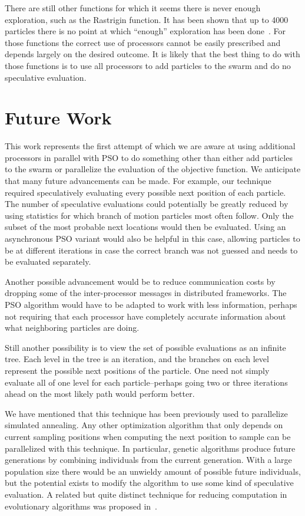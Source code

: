 \documentclass[conference,letterpaper]{IEEEtran}
\begin{document}
There are still other functions for which it seems there is never enough
exploration, such as the Rastrigin function.  It has been shown that up to 4000
particles there is no point at which ``enough'' exploration has been
done~\cite{mcnabb-cec09}.  For those functions the correct use of processors
cannot be easily prescribed and depends largely on the desired outcome.  It is
likely that the best thing to do with those functions is to use all processors
to add particles to the swarm and do no speculative evaluation.

\section{Future Work}
\label{sec:future}

This work represents the first attempt of which we are aware at using
additional processors in parallel with PSO to do something other than either
add particles to the swarm or parallelize the evaluation of the objective
function.  We anticipate that many future advancements can be made.  For
example, our technique required speculatively evaluating every possible next
position of each particle.  The number of speculative evaluations could
potentially be greatly reduced by using statistics for which branch of motion
particles most often follow.  Only the subset of the most probable next
locations would then be evaluated.  Using an asynchronous PSO variant would
also be helpful in this case, allowing particles to be at different iterations
in case the correct branch was not guessed and needs to be evaluated
separately.

Another possible advancement would be to reduce communication costs by dropping
some of the inter-processor messages in distributed frameworks.  The PSO
algorithm would have to be adapted to work with less information, perhaps not
requiring that each processor have completely accurate information about what
neighboring particles are doing.

Still another possibility is to view the set of possible evaluations as an
infinite tree.  Each level in the tree is an iteration, and the branches on
each level represent the possible next positions of the particle.  One need not
simply evaluate all of one level for each particle--perhaps going two or three
iterations ahead on the most likely path would perform better.

We have mentioned that this technique has been previously used to parallelize
simulated annealing.  Any other optimization algorithm that only depends on 
current sampling positions when computing the next position to sample can be
parallelized with this technique.  In particular, genetic algorithms produce
future generations by combining individuals from the current generation.  With
a large population size there would be an unwieldy amount of possible future
individuals, but the potential exists to modify the algorithm to use some kind
of speculative evaluation.  A related but quite distinct technique for reducing
computation in evolutionary algorithms was proposed in~\cite{poli-ai06}.
\end{document}
